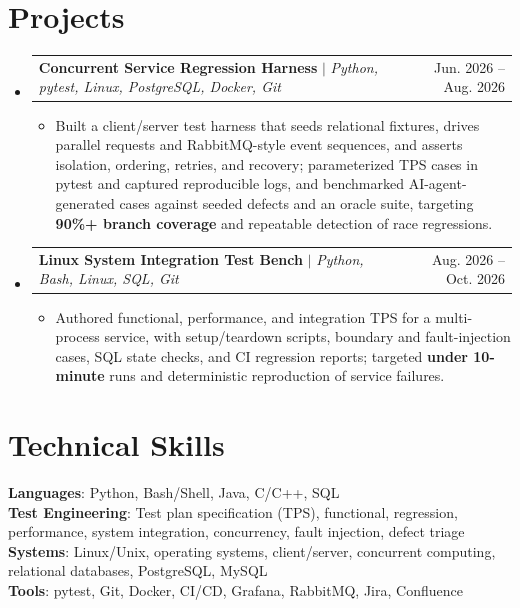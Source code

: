 \documentclass[letterpaper,11pt]{article}
\makeatletter
\newcommand{\resumeItem}[1]{
  \item\small{
    {#1 \vspace{-2pt}}
  }
}
\newcommand{\resumeProjectHeading}[2]{
    \item
    \begin{tabular*}{0.97\textwidth}{l@{\extracolsep{\fill}}r}
      \small#1 & #2 \\
    \end{tabular*}\vspace{-7pt}
}
\newcommand{\resumeSubHeadingListStart}{\begin{itemize}[leftmargin=0.15in, label={}]}
\newcommand{\resumeSubHeadingListEnd}{\end{itemize}}
\newcommand{\resumeItemListStart}{\begin{itemize}}
\newcommand{\resumeItemListEnd}{\end{itemize}\vspace{-5pt}}
\makeatother
\begin{document}
\section{Projects}
\resumeSubHeadingListStart
\resumeProjectHeading
{\textbf{Concurrent Service Regression Harness} $|$ \emph{Python, pytest, Linux, PostgreSQL, Docker, Git}}{Jun. 2026 -- Aug. 2026}
\resumeItemListStart
\resumeItem{Built a client/server test harness that seeds relational fixtures, drives parallel requests and RabbitMQ-style event sequences, and asserts isolation, ordering, retries, and recovery; parameterized TPS cases in pytest and captured reproducible logs, and benchmarked AI-agent-generated cases against seeded defects and an oracle suite, targeting \textbf{90\%+ branch coverage} and repeatable detection of race regressions.}
\resumeItemListEnd
\resumeProjectHeading
{\textbf{Linux System Integration Test Bench} $|$ \emph{Python, Bash, Linux, SQL, Git}}{Aug. 2026 -- Oct. 2026}
\resumeItemListStart
\resumeItem{Authored functional, performance, and integration TPS for a multi-process service, with setup/teardown scripts, boundary and fault-injection cases, SQL state checks, and CI regression reports; targeted \textbf{under 10-minute} runs and deterministic reproduction of service failures.}
\resumeItemListEnd
\resumeSubHeadingListEnd

\section{Technical Skills}
\begin{itemize}[leftmargin=0.15in, label={}]
  \small{\item{
        \textbf{Languages}{: Python, Bash/Shell, Java, C/C++, SQL} \\
        \textbf{Test Engineering}{: Test plan specification (TPS), functional, regression, performance, system integration, concurrency, fault injection, defect triage} \\
        \textbf{Systems}{: Linux/Unix, operating systems, client/server, concurrent computing, relational databases, PostgreSQL, MySQL} \\
        \textbf{Tools}{: pytest, Git, Docker, CI/CD, Grafana, RabbitMQ, Jira, Confluence}
        }}
\end{itemize}

\end{document}
